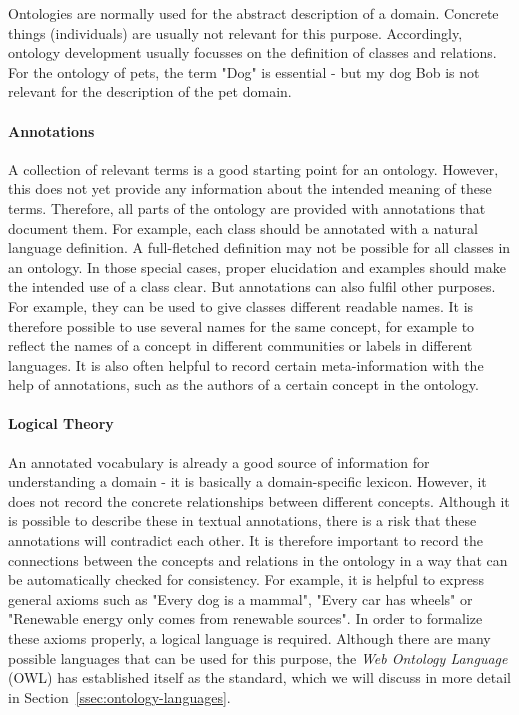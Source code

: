 Ontologies are normally used for the abstract description of a domain. Concrete things (individuals) are usually not relevant for this purpose. Accordingly, ontology development usually focusses on the definition of classes and relations. For the ontology of pets, the term "Dog" is essential - but my dog Bob is not relevant for the description of the pet domain.

\paragraph{Annotations}

A collection of relevant terms is a good starting point for an ontology. However, this does not yet provide any information about the intended meaning of these terms. Therefore, all parts of the ontology are provided with annotations that document them. For example, each class should be annotated with a natural language definition. A full-fletched definition may not be possible 
 for all classes in an ontology. In those special cases, proper elucidation and examples should make the intended use of a class clear.  But annotations can also fulfil other purposes. For example, they can be used to give classes different readable names. It is therefore possible to use several names for the same concept, for example to reflect the names of a concept in different communities or labels in different languages. %
 It is also often helpful to record certain meta-information with the help of annotations, such as the authors of a certain concept in the ontology.

\paragraph{Logical Theory} 

An annotated vocabulary is already a good source of information for understanding a domain - it is basically a domain-specific lexicon. However, it does not record the concrete relationships between different concepts. Although it is possible to describe these in textual annotations, there is a risk that these annotations will contradict each other. It is therefore important to record the connections between the concepts and relations in the ontology in a way that can be automatically checked for consistency. For example, it is helpful to express general axioms such as "Every dog is a mammal", "Every car has wheels" or "Renewable energy only comes from renewable sources". In order to formalize these axioms properly, a logical language is required. Although there are many possible languages that can be used for this purpose, the \textit{Web Ontology Language} (OWL) has established itself as the standard, which we will discuss in more detail in Section~\ref{ssec:ontology-languages}.

